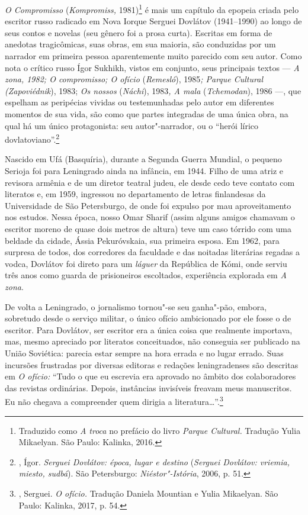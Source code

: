 \movetoevenpage
\pagebreak
\begin{center}
{}
\end{center}
\label{posfacio}

\bigskip

\emph{O Compromisso} (\emph{Kompromiss,} 1981)\footnote{Traduzido como
  \emph{A troca} no prefácio do livro \emph{Parque Cultural.} Tradução
  Yulia Mikaelyan. São Paulo: Kalinka, 2016.} é mais um capítulo da
epopeia criada pelo escritor russo radicado em Nova Iorque Serguei
Dovlátov (1941--1990) ao longo de seus contos e novelas (seu gênero foi
a prosa curta). Escritas em forma de anedotas tragicômicas, suas obras,
em sua maioria, são conduzidas por um narrador em primeira pessoa
aparentemente muito parecido com seu autor. Como nota o crítico russo
Ígor Sukhikh, vistos em conjunto, seus principais textos --- \emph{A
zona, 1982; O compromisso; O ofício} (\emph{Remesló}),
1985\emph{; Parque Cultural (Zapoviédnik}), 1983; \emph{Os
nossos} (\emph{Náchi}), 1983\emph{, A mala}
(\emph{Tchemodan}), 1986 ---, que espelham as peripécias vividas
ou testemunhadas pelo autor em diferentes momentos de sua vida, são como
que partes integradas de uma única obra, na qual há um único
protagonista: seu autor"-narrador, ou o ``herói lírico
dovlatoviano''.\footnote{, Ígor. \emph{Serguei Dovlátov: época,
  lugar e destino} (\emph{Serguei Dovlátov: vriemia, miesto, sudbá}). São
  Petersburgo: \emph{Niéstor"-Istória}, 2006, p. 51.}

Nascido em Ufá (Basquíria), durante a Segunda Guerra Mundial, o pequeno
Serioja foi para Leningrado ainda na infância, em 1944. Filho de uma
atriz e revisora armênia e de um diretor teatral judeu, ele desde cedo
teve contato com literatos e, em 1959, ingressou no departamento de
letras finlandesas da Universidade de São Petersburgo, de onde foi
expulso por mau aproveitamento nos estudos. Nessa época, nosso Omar
Sharif (assim alguns amigos chamavam o escritor moreno de quase dois
metros de altura) teve um caso tórrido com uma beldade da cidade, Ássia
Pekuróvskaia, sua primeira esposa. Em 1962, para surpresa de todos, dos
corredores da faculdade e das noitadas literárias regadas a vodca,
Dovlátov foi direto para um \emph{láguer} da República de Kómi, onde
serviu três anos como guarda de prisioneiros escoltados, experiência
explorada em \emph{A zona}.

De volta a Leningrado, o jornalismo tornou"-se seu ganha"-pão, embora,
sobretudo desde o serviço militar, o único ofício ambicionado por ele
fosse o de escritor. Para Dovlátov, ser escritor era a única coisa que
realmente importava, mas, mesmo apreciado por literatos conceituados,
não conseguia ser publicado na União Soviética: parecia estar sempre na
hora errada e no lugar errado. Suas incursões frustradas por diversas
editoras e redações leningradenses são descritas em \emph{O ofício:}
``Tudo o que eu escrevia era aprovado no âmbito dos colaboradores das
revistas ordinárias. Depois, instâncias invi­síveis freavam meus
manuscritos. Eu não chegava a compreen­der quem dirigia a
literatura\ldots{}''.\footnote{, Serguei. \emph{O ofício.} Tradução
  Daniela Mountian e Yulia Mikaelyan. São Paulo: Kalinka, 2017, p. 54.}

